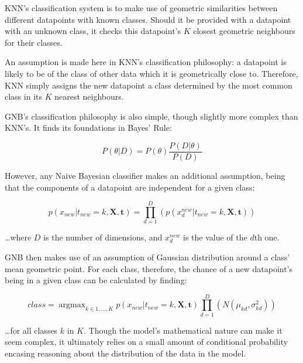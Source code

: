 \documentclass{tufte-handout}
\DeclareMathOperator*{\argmax}{argmax}
\begin{document}
\bigskip

KNN's classification system is to make use of geometric similarities between different datapoints with known classes. Should it be provided with a datapoint with an unknown class, it checks this datapoint's \(K\) closest geometric neighbours for their classes.\par

An assumption is made here in KNN's classification philosophy: a datapoint is likely to be of the class of other data which it is geometrically close to. Therefore, KNN simply assigns the new datapoint a class determined by the most common class in its \(K\) nearest neighbours.\par

\bigskip

GNB's classification philosophy is also simple, though slightly more complex than KNN's. It finds its foundations in Bayes' Rule:\par

\[P(\theta|D) = P(\theta{}) \frac{P(D|\theta{})}{P(D)}\]

However, any Naive Bayesian classifier makes an additional assumption, being that the components of a datapoint are independent for a given class:

\[p(x_{new}|t_{new}=k, \textbf{X}, \textbf{t}) = \prod_{d=1}^{D}(p(x_{d}^{new}|t_{new}=k,\textbf{X},\textbf{t}))\]

\ldots{}where \(D\) is the number of dimensions, and \(x_{d}^{new}\) is the value of the \(d\)th one.\par

GNB then makes use of an assumption of Gaussian distribution around a class' mean geometric point. For each class, therefore, the chance of a new datapoint's being in a given class can be calculated by finding:

\[class = \argmax_{k\in{}1,\ldots{},K}p(x_{new}|t_{new}=k, \textbf{X}, \textbf{t})\prod_{d=1}^{D}(N(\mu_{kd},\sigma_{kd}^{2}))\]

\ldots{}for all classes \(k\) in \(K\). Though the model's mathematical nature can make it seem complex, it ultimately relies on a small amount of conditional probability encasing reasoning about the distribution of the data in the model.\par
\end{document}
